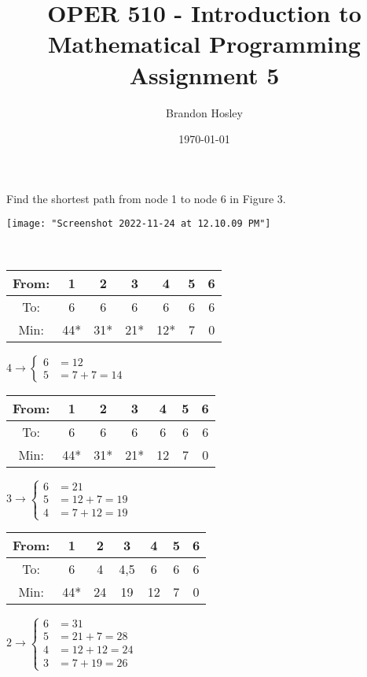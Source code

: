 \documentclass[answers]{exam}
\title{OPER 510 - Introduction to Mathematical Programming%
	\\ Assignment 5}
\author{Brandon Hosley}
\date{\today}
\begin{document}
\maketitle
\unframedsolutions

\begin{questions}
\question
Find the shortest path from node 1 to node 6 in Figure 3.

\texttt{[image: "Screenshot 2022-11-24 at 12.10.09 PM"]}

\begin{solution} \\
	\begin{tabular}{ccccccc}
		From: &  1  &  2  &  3  &  4  & 5 & 6 \\ \midrule
		 To:  &  6  &  6  &  6  &  6  & 6 & 6 \\
		Min:  & 44* & 31* & 21* & 12* & 7 & 0
	\end{tabular} \hspace{6ex} \medskip
	\( 4 \rightarrow \begin{cases}
		6 &= 12 \\
		5 &= 7+7=14
	\end{cases} \) \\
	\begin{tabular}{ccccccc}
		From: &  1  &  2  &  3  & 4  & 5 & 6 \\ \midrule
		 To:  &  6  &  6  &  6  & 6  & 6 & 6 \\
		Min:  & 44* & 31* & 21* & 12 & 7 & 0
	\end{tabular} \hspace{7.25ex} \smallskip
	\( 3 \rightarrow \begin{cases}
		6 &= 21 \\
		5 &= 12+7=19 \\
		4 &= 7+12=19
	\end{cases} \) \\
	\begin{tabular}{ccccccc}
		From: &  1  & 2  &  3  & 4  & 5 & 6 \\ \midrule
		 To:  &  6  & 4  & 4,5 & 6  & 6 & 6 \\
		Min:  & 44* & 24 & 19  & 12 & 7 & 0
	\end{tabular} \hspace{9ex}
	\( 2 \rightarrow \begin{cases}
		6 &= 31 \\
		5 &= 21+7=28 \\
		4 &= 12+12=24 \\
		3 &= 7+19=26
	\end{cases} \) \\

\end{solution}
\end{questions}
\end{document}
